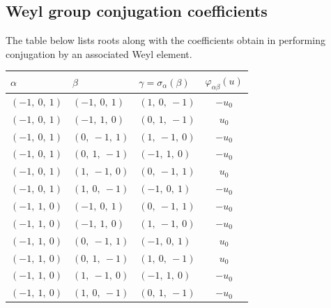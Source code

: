 \documentclass[11pt]{article}
\newcommand{\noi}{\noindent}
\theoremstyle{definition}
\begin{document}
\subsection{Weyl group conjugation coefficients}

The table below lists roots along with the coefficients obtain in performing conjugation by an associated Weyl element.

\bigskip

\noi \noindent \begin{longtable}{|l|l|l|c|}
    \hline
    \textbf{$\alpha$} & \textbf{$\beta$} & \textbf{$\gamma = \sigma_{\alpha}(\beta)$} & $\varphi_{\alpha\beta}(u)$ \\
    \hline
    \endhead
    $\left( -1, \  0, \  1\right)$ & $\left( -1, \  0, \  1\right)$ & $\left( 1, \  0, \  -1\right)$ & $- u_{0}$ \\
    \hline
    $\left( -1, \  0, \  1\right)$ & $\left( -1, \  1, \  0\right)$ & $\left( 0, \  1, \  -1\right)$ & $u_{0}$ \\
    \hline
    $\left( -1, \  0, \  1\right)$ & $\left( 0, \  -1, \  1\right)$ & $\left( 1, \  -1, \  0\right)$ & $- u_{0}$ \\
    \hline
    $\left( -1, \  0, \  1\right)$ & $\left( 0, \  1, \  -1\right)$ & $\left( -1, \  1, \  0\right)$ & $- u_{0}$ \\
    \hline
    $\left( -1, \  0, \  1\right)$ & $\left( 1, \  -1, \  0\right)$ & $\left( 0, \  -1, \  1\right)$ & $u_{0}$ \\
    \hline
    $\left( -1, \  0, \  1\right)$ & $\left( 1, \  0, \  -1\right)$ & $\left( -1, \  0, \  1\right)$ & $- u_{0}$ \\
    \hline
    $\left( -1, \  1, \  0\right)$ & $\left( -1, \  0, \  1\right)$ & $\left( 0, \  -1, \  1\right)$ & $- u_{0}$ \\
    \hline
    $\left( -1, \  1, \  0\right)$ & $\left( -1, \  1, \  0\right)$ & $\left( 1, \  -1, \  0\right)$ & $- u_{0}$ \\
    \hline
    $\left( -1, \  1, \  0\right)$ & $\left( 0, \  -1, \  1\right)$ & $\left( -1, \  0, \  1\right)$ & $u_{0}$ \\
    \hline
    $\left( -1, \  1, \  0\right)$ & $\left( 0, \  1, \  -1\right)$ & $\left( 1, \  0, \  -1\right)$ & $u_{0}$ \\
    \hline
    $\left( -1, \  1, \  0\right)$ & $\left( 1, \  -1, \  0\right)$ & $\left( -1, \  1, \  0\right)$ & $- u_{0}$ \\
    \hline
    $\left( -1, \  1, \  0\right)$ & $\left( 1, \  0, \  -1\right)$ & $\left( 0, \  1, \  -1\right)$ & $- u_{0}$ \\

\end{longtable}
\end{document}

